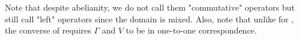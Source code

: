 \begin{remark}
Note that despite abelianity, we do not call them "commutative" operators but still call "left" operators since the domain is mixed. Also, note that unlike for , the converse of  requires $\Gamma$ and $V$ to be in one-to-one correspondence.
\end{remark}







